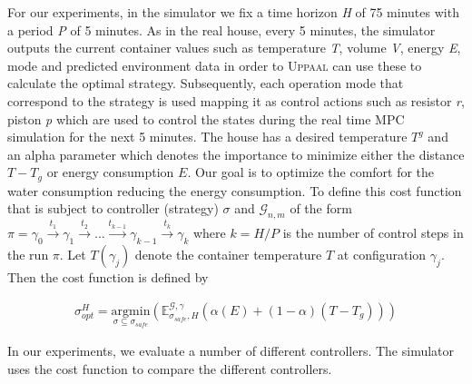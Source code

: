         For our experiments, in the simulator we fix a time horizon \emph{H} of 75 minutes
        with a period \emph{P} of 5 minutes. As in the real house, every 
        5 minutes, the simulator outputs the current container values such as
        temperature \emph{T}, volume \emph{V}, energy \emph{E}, mode and predicted 
        environment data in order to \textsc{Uppaal} can use these to calculate the optimal
        strategy. Subsequently, each operation mode that correspond to the strategy
        is used mapping it as control actions such as resistor \emph{r}, 
        piston \emph{p} which are used to control the states during the 
        real time \ac{MPC} simulation for the next 5 minutes. The house 
        has a desired temperature $T^g$ and an alpha parameter which denotes 
        the importance to minimize either the distance $T - T_g$ or energy 
        consumption $E$. Our goal is to optimize  
        the comfort for the water consumption reducing the energy consumption. 
        To define this cost function that is subject to controller (strategy) $\sigma$ and 
        $\mathcal{G}_{n,m}$ of the form $\pi = \gamma_0 \xrightarrow{t_{1}} 
        \gamma_1 \xrightarrow{t_{2}} ... \xrightarrow{t_{k-1}} 
        \gamma_{k-1} \xrightarrow{t_{k}} \gamma_{k}$ where $k = H/P$ is the 
        number of control steps in the run $\pi$. Let $T(\gamma_j)$ denote
        the container temperature $T$ at configuration $\gamma_j$. Then the 
        cost function is defined by

        \begin{equation}
          \begin{aligned}
            \sigma^{H}_{opt} = \underset{\sigma \subseteq \sigma_{safe}}{\mathrm{argmin}}(\mathbb{E}^{\mathcal{G},\gamma}_{\sigma_{safe},H}(\alpha(E) + (1-\alpha)(T-T_g)))            
          \end{aligned}
          \label{eq:costfunction}
        \end{equation}

        In our experiments, we evaluate a number of different controllers. The 
        simulator uses the cost function to compare the different
        controllers.

        \clearpage

